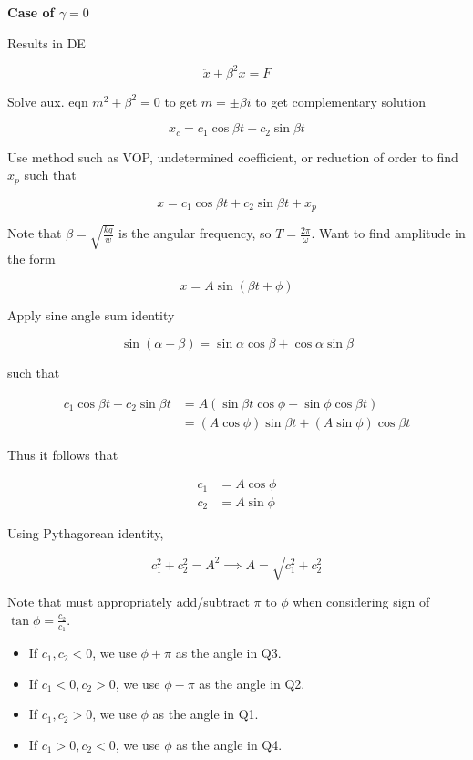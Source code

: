 \textbf{Case of $\gamma = 0$}

Results in DE

\begin{equation}
    \ddot x +\beta^2 x= F
\end{equation}

Solve aux. eqn $m^2+\beta^2=0$ to get $m =\pm \beta i$ to get complementary solution

\begin{equation}
    x_c=c_1\cos\beta t + c_2\sin\beta t
\end{equation}

Use method such as VOP, undetermined coefficient, or reduction of order to find $x_p$ such that

\begin{equation}
    x = c_1\cos\beta t + c_2\sin\beta t + x_p
\end{equation}

Note that $\beta = \sqrt{\frac{kg}{w}}$ is the angular frequency, so $T=\frac{2\pi}{\omega}$.
Want to find amplitude in the form

\begin{equation}
    x=A\sin (\beta t+\phi)
\end{equation}

Apply sine angle sum identity

\begin{equation}
    \sin(\alpha + \beta)=\sin\alpha \cos\beta + \cos\alpha \sin\beta
\end{equation}

such that

\begin{align}
    c_1\cos\beta t + c_2\sin\beta t&=A(\sin\beta t\cos\phi +\sin\phi \cos\beta t)\\
    &=(A\cos\phi)\sin\beta t+(A\sin\phi)\cos\beta t
\end{align}

Thus it follows that

\begin{align}
    c_1&=A\cos\phi\\
    c_2&=A\sin\phi
\end{align}

Using Pythagorean identity,

\begin{equation}
    c_1^2+c_2^2=A^2\implies A=\sqrt{c_1^2+c_2^2}
\end{equation}

Note that must appropriately add/subtract $\pi$ to $\phi$ when considering sign of $\tan\phi=\frac{c_2}{c_1}$.
\begin{itemize}
    \item If $c_1,c_2<0$, we use $\phi+\pi$ as the angle in Q3.
    \item If $c_1<0,c_2>0$, we use $\phi-\pi$ as the angle in Q2.
    \item If $c_1,c_2>0$, we use $\phi$ as the angle in Q1.
    \item If $c_1>0, c_2<0$, we use $\phi$ as the angle in Q4.
\end{itemize}

